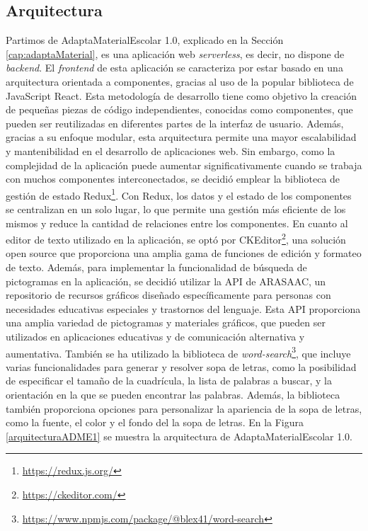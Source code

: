 \subsection{Arquitectura}
\label{sub:Arquitectura}
Partimos de AdaptaMaterialEscolar 1.0, explicado en la Sección \ref{cap:adaptaMaterial}, es una aplicación web \textit{serverless}, es decir, no dispone de \textit{backend}. El \textit{frontend} de esta aplicación se caracteriza por estar basado en una arquitectura orientada a componentes, gracias al uso de la popular biblioteca de JavaScript React. Esta metodología de desarrollo tiene como objetivo la creación de pequeñas piezas de código independientes, conocidas como componentes, que pueden ser reutilizadas en diferentes partes de la interfaz de usuario. Además, gracias a su enfoque modular, esta arquitectura permite una mayor escalabilidad y mantenibilidad en el desarrollo de aplicaciones web. Sin embargo, como la complejidad de la aplicación puede aumentar significativamente cuando se trabaja con muchos componentes interconectados, se decidió emplear la biblioteca de gestión de estado Redux\footnote{\url{https://redux.js.org/}}. Con Redux, los datos y el estado de los componentes se centralizan en un solo lugar, lo que permite una gestión más eficiente de los mismos y reduce la cantidad de relaciones entre los componentes. En cuanto al editor de texto utilizado en la aplicación, se optó por CKEditor\footnote{\url{https://ckeditor.com/}}, una solución open source que proporciona una amplia gama de funciones de edición y formateo de texto. Además, para implementar la funcionalidad de búsqueda de pictogramas en la aplicación, se decidió utilizar la API de ARASAAC, un repositorio de recursos gráficos diseñado específicamente para personas con necesidades educativas especiales y trastornos del lenguaje. Esta API proporciona una amplia variedad de pictogramas y materiales gráficos, que pueden ser utilizados en aplicaciones educativas y de comunicación alternativa y aumentativa. También se ha utilizado la biblioteca de \textit{word-search}\footnote{\url{https://www.npmjs.com/package/@blex41/word-search}}, que incluye varias funcionalidades para generar y resolver sopa de letras, como la posibilidad de especificar el tamaño de la cuadrícula, la lista de palabras a buscar, y la orientación en la que se pueden encontrar las palabras. Además, la biblioteca también proporciona opciones para personalizar la apariencia de la sopa de letras, como la fuente, el color y el fondo del la sopa de letras. En la Figura \ref{arquitecturaADME1} se muestra la arquitectura de AdaptaMaterialEscolar 1.0.

